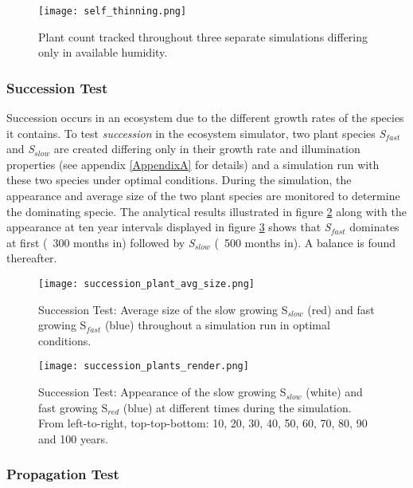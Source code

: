 \begin{figure}
\center
	\texttt{[image: self\_thinning.png]}
	\caption{ Plant count tracked throughout three separate simulations differing only in available humidity. }
	\label{fig:self_thinning_test_results}
\end{figure}

\subsubsection{Succession Test}

Succession occurs in an ecosystem due to the different growth rates of the species it contains. To test \textit{succession} in the ecosystem simulator, two plant species \textit{S$_{fast}$} and \textit{S$_{slow}$} are created differing only in their growth rate and illumination properties (see appendix \ref{AppendixA} for details) and a simulation run with these two species under optimal conditions. During the simulation, the appearance and average size of the two plant species are monitored to determine the dominating specie. The analytical results illustrated in figure \ref{fig:succession_plants_avg_size} along with the appearance at ten year intervals displayed in figure \ref{fig:succession_plants_render} shows that \textit{S$_{fast}$} dominates at first (~300 months in) followed by \textit{S$_{slow}$} (~500 months in). A balance is found thereafter.

\begin{figure}
\center
	\texttt{[image: succession\_plant\_avg\_size.png]}
	\caption{ Succession Test: Average size of the slow growing S$_{slow}$ (red) and fast growing S$_{fast}$ (blue) throughout a simulation run in optimal conditions. }
	\label{fig:succession_plants_avg_size}
\end{figure}

\begin{figure}
\center
	\texttt{[image: succession\_plants\_render.png]}
	\caption{ Succession Test: Appearance of the slow growing S$_{slow}$ (white) and fast growing S$_{red}$ (blue) at different times during the simulation. From left-to-right, top-top-bottom: 10, 20, 30, 40, 50, 60, 70, 80, 90 and 100 years.}
	\label{fig:succession_plants_render}
\end{figure}

\subsubsection{Propagation Test}

